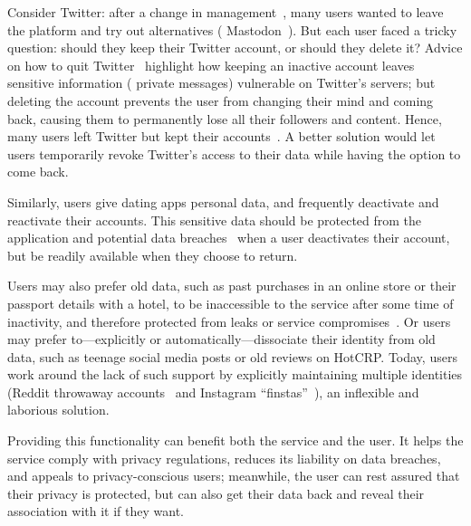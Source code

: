 Consider Twitter: after a change in management~\cite{musk-twitter}, many users
wanted to leave the platform and try out alternatives (\eg
Mastodon~\cite{mastadon}).  But each user faced a tricky question: should they
keep their Twitter account, or should they delete it?
%
Advice on how to quit Twitter~\cite{quit-twitter-india, quit-twitter-mash}
highlight how keeping an inactive account leaves sensitive information (\eg
private messages) vulnerable on Twitter's servers; but deleting the account
prevents the user from changing their mind and coming back, causing them to
permanently lose all their followers and content.  Hence, many users left
Twitter but kept their accounts~\cite{nbc-twitter,shondarhimes,kenolin}.
%
A better solution would let users temporarily revoke Twitter's access to their
data while having the option to come back.

Similarly, users give dating apps personal data, and frequently deactivate and
reactivate their accounts.
%
This sensitive data should be protected from the application and potential data
breaches~\cite{tinder, okcupid} when a user deactivates their account, but be
readily available when they choose to return.

Users may also prefer old data, such as past purchases in an online store or
their passport details with a hotel, to be inaccessible to the service after
some time of inactivity, and therefore protected from leaks or service
compromises~\cite{retention,breach:marriott}. Or users may prefer
to---explicitly or automatically---dissociate their identity from old data, such
as teenage social media posts or old reviews on HotCRP.
%
Today, users work around the lack of such support by explicitly maintaining
multiple identities (\eg Reddit throwaway accounts~\cite{reddit:throwaway} and
Instagram ``finstas''~\cite{nytimes:finsta}), an inflexible and laborious
solution.
%

%
Providing this functionality can benefit both the service and the user.
%
It helps the service comply with privacy regulations, reduces its liability on
data breaches, and appeals to privacy-conscious users; meanwhile, the user can
rest assured that their privacy is protected, but can also get their data back
and reveal their association with it if they want.


